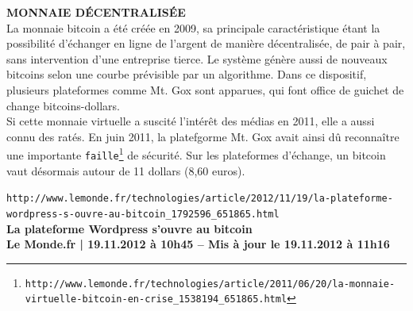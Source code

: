 \documentclass[11pt,twoside,a4paper]{article}
\begin{document}
\textbf{\textsc{MONNAIE D{\'E}CENTRALIS{\'E}E}}~\\

La monnaie bitcoin a {\'e}t{\'e} cr{\'e}{\'e}e en 2009, sa principale caract{\'e}ristique {\'e}tant la possibilit{\'e} d'{\'e}changer en ligne de l'argent de mani{\`e}re d{\'e}centralis{\'e}e, de pair {\`a} pair, sans intervention d'une entreprise tierce. Le syst{\`e}me g{\'e}n{\`e}re aussi de nouveaux bitcoins selon une courbe pr{\'e}visible par un algorithme. Dans ce dispositif, plusieurs plateformes comme Mt. Gox sont apparues, qui font office de guichet de change bitcoins-dollars. ~\\

Si cette monnaie virtuelle a suscit{\'e} l'int{\'e}r{\^e}t des m{\'e}dias en 2011, elle a aussi connu des rat{\'e}s. En juin 2011, la platefgorme Mt. Gox avait ainsi d{\^u} reconna{\^i}tre une importante \texttt{faille\footnote{\texttt{http://www.lemonde.fr/technologies/article/2011/06/20/la-monnaie-virtuelle-bitcoin-en-crise\_1538194\_651865.html}}} de s{\'e}curit{\'e}. Sur les plateformes d'{\'e}change, un bitcoin vaut d{\'e}sormais autour de 11 dollars (8,60 euros). ~\\


\clearpage

\texttt{http://www.lemonde.fr/technologies/article/2012/11/19/la-plateforme-wordpress-s-ouvre-au-bitcoin\_1792596\_651865.html}~\\

\textbf{La plateforme Wordpress s'ouvre au bitcoin}~\\

\textbf{\small Le Monde.fr | 19.11.2012 {\`a} 10h45 -- Mis {\`a} jour le 19.11.2012 {\`a} 11h16 }~\\
\end{document}
